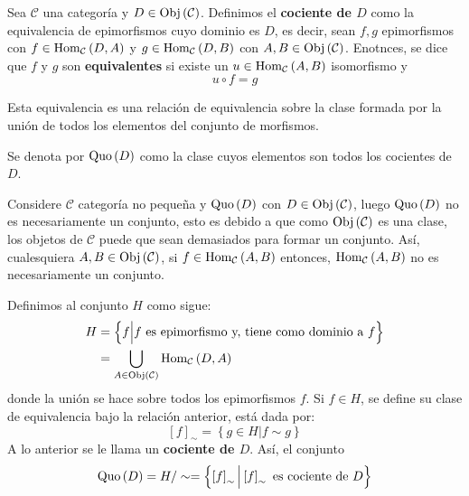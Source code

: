 \documentclass[12pt]{report}
\theoremstyle{largebreak}
\newcommand{\Obj}[1]{\ensuremath{\textup{Obj}\left(#1\right)}}
\newcommand{\Hom}[3]{\ensuremath{\textup{Hom}_{#1}\left(#2,#3\right)}}
\newcommand{\Quo}[1]{\ensuremath{\textup{Quo}\left(#1 \right)}}
\begin{document}
    \begin{mydef}
        Sea $\mathcal{C}$ una categoría y $D\in\Obj{\mathcal{C}}$. Definimos el \textbf{cociente de $D$} como la equivalencia de epimorfismos cuyo dominio es $D$, es decir, sean $f,g$ epimorfismos con $f\in\Hom{\mathcal{C}}{D}{A}$ y $g\in\Hom{\mathcal{C}}{D}{B}$ con $A,B\in\Obj{\mathcal{C}}$. Enotnces, se dice que $f$ y $g$ son \textbf{equivalentes} si existe un $u\in\Hom{\mathcal{C}}{A}{B}$ isomorfismo y
        \begin{equation*}
            u\circ f = g
        \end{equation*}
    \end{mydef}

    Esta equivalencia es una relación de equivalencia sobre la clase formada por la unión de todos los elementos del conjunto de morfismos.

    \begin{obs}
        Se denota por $\Quo{D}$ como la clase cuyos elementos son todos los cocientes de $D$.
    \end{obs}

    \begin{obs}
        Considere $\mathcal{C}$ categoría no pequeña y $\Quo{D}$ con $D\in\Obj{\mathcal{C}}$, luego $\Quo{D}$ no es necesariamente un conjunto, esto es debido a que como $\Obj{\mathcal{C}}$ es una clase, los objetos de $\mathcal{C}$ puede que sean demasiados para formar un conjunto.
        Así, cualesquiera $A,B\in\Obj{\mathcal{C}}$, si $f\in\Hom{\mathcal{C}}{A}{B}$ entonces, $\Hom{\mathcal{C}}{A}{B}$ no es necesariamente un conjunto.
    \end{obs}

    Definimos al conjunto $H$ como sigue:
    \begin{equation*}
        \begin{split}
            H&=\left\{ f\Big|f\textup{ es epimorfismo y, tiene como dominio a }f \right\}\\
            &=\bigcup_{A\in\Obj{\mathcal{C}}}\Hom{\mathcal{C}}{D}{A}\\            
        \end{split}
    \end{equation*}
    donde la unión se hace sobre todos los epimorfismos $f$. Si $f\in H$, se define su clase de equivalencia bajo la relación anterior, está dada por:
    \begin{equation*}
        \left[f\right]_{\sim}=\left\{g\in H\Big|f\sim g \right\}
    \end{equation*}
    A lo anterior se le llama un \textbf{cociente de $D$}. Así, el conjunto
    \begin{equation*}
        \Quo{D}=H/\sim=\left\{\left[f\right]_{\sim}\Big|\left[f\right]_{\sim}\textup{ es cociente de }D\right\}
    \end{equation*}
\end{document}
